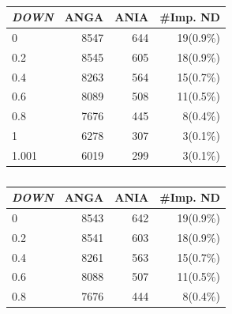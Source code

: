 \begin{table}[ht]
\centering
\begin{subtable}[h]{0.45\textwidth}
\begin{tabular}{lrrr}
\hline
\textit{DOWN} & ANGA  & ANIA & \#Imp. ND \\ \hline
0     & 8547 & 644 & 19(0.9\%) \\
0.2   & 8545 & 605 & 18(0.9\%) \\
0.4   & 8263 & 564 & 15(0.7\%) \\
0.6   & 8089 & 508 & 11(0.5\%) \\
0.8   & 7676 & 445 & 8(0.4\%)  \\
1     & 6278 & 307 & 3(0.1\%)  \\
1.001 & 6019 & 299 & 3(0.1\%)  
\end{tabular}
 \caption{}
 \label{tab:UD-difference-1.001}
\end{subtable}
\hfill
\begin{subtable}[h]{0.45\textwidth}
\centering
\begin{tabular}{lrrr}
\hline
\textit{DOWN} & ANGA  & ANIA & \#Imp. ND  \\ \hline
0     & 8543 & 642 & 19(0.9\%) \\
0.2   & 8541 & 603 & 18(0.9\%) \\
0.4   & 8261 & 563 & 15(0.7\%) \\
0.6   & 8088 & 507 & 11(0.5\%) \\
0.8   & 7676 & 444 & 8(0.4\%)  \\

\end{tabular}
\end{subtable}
\end{table}

